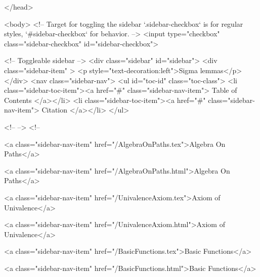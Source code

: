   
</head>




  <body>
    <!-- Target for toggling the sidebar `.sidebar-checkbox` is for regular
     styles, `#sidebar-checkbox` for behavior. -->
<input type="checkbox" class="sidebar-checkbox" id="sidebar-checkbox">

<!-- Toggleable sidebar -->
<div class="sidebar" id="sidebar">
  <div class="sidebar-item" >
    <p style="text-decoration:left">Sigma lemmas</p>
  </div>
  <nav class="sidebar-nav">
    <ul id="toc-id" class="toc-class">
  <li class="sidebar-toc-item"><a href="#" class="sidebar-nav-item"> Table of Contents </a></li>
  <li class="sidebar-toc-item"><a href="#" class="sidebar-nav-item"> Citation </a></li>
</ul>


    <!--  -->
    <!-- 
      
    
      
    
      
    
      
        
      
    
      
        
          <a class="sidebar-nav-item" href="/AlgebraOnPaths.tex">Algebra On Paths</a>
        
      
    
      
        
          <a class="sidebar-nav-item" href="/AlgebraOnPaths.html">Algebra On Paths</a>
        
      
    
      
        
          <a class="sidebar-nav-item" href="/UnivalenceAxiom.tex">Axiom of Univalence</a>
        
      
    
      
        
          <a class="sidebar-nav-item" href="/UnivalenceAxiom.html">Axiom of Univalence</a>
        
      
    
      
        
          <a class="sidebar-nav-item" href="/BasicFunctions.tex">Basic Functions</a>
        
      
    
      
        
          <a class="sidebar-nav-item" href="/BasicFunctions.html">Basic Functions</a>
        
      
    
      
        

